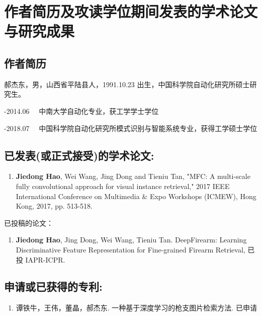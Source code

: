 
\chapter{作者简历及攻读学位期间发表的学术论文与研究成果}

\section*{作者简历}

\noindent
郝杰东，男，山西省平陆县人，1991.10.23 出生，中国科学院自动化研究所硕士研究生。

-2014.06 \ \ 中南大学自动化专业，获工学学士学位

-2018.07 \ \ 中国科学院自动化研究所模式识别与智能系统专业，获得工学硕士学位

\section*{已发表(或正式接受)的学术论文:}

\begin{enumerate}[(1)]

	\item \textbf{Jiedong Hao}, Wei Wang, Jing Dong and Tieniu Tan, "MFC: A multi-scale fully convolutional approach for visual instance retrieval," 2017 IEEE International Conference on Multimedia \& Expo Workshops (ICMEW), Hong Kong, 2017, pp. 513-518.
\end{enumerate}

\noindent 已投稿的论文：

\begin{enumerate}[(1)]
	\item \textbf{Jiedong Hao}, Jing Dong, Wei Wang, Tieniu Tan. DeepFirearm: Learning Discriminative Feature
Representation for Fine-grained Firearm Retrieval, 已投 IAPR-ICPR.
\end{enumerate}

\section*{申请或已获得的专利:}

\begin{enumerate}[(1)]
	\item 谭铁牛，王伟，董晶，郝杰东. 一种基于深度学习的枪支图片检索方法. 已申请
\end{enumerate}

